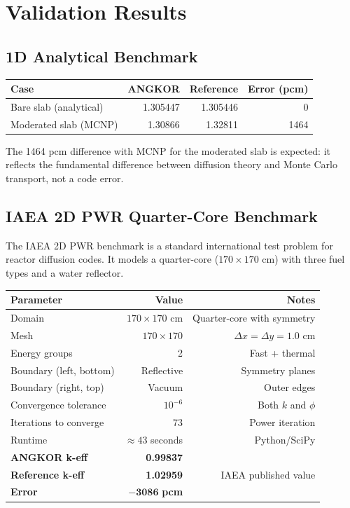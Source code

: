 \documentclass[12pt,a4paper]{article}
\begin{document}
\section{Validation Results}

\subsection{1D Analytical Benchmark}

\begin{center}
\begin{tabular}{lrrr}
\toprule
\textbf{Case} & \textbf{ANGKOR} & \textbf{Reference} & \textbf{Error (pcm)} \\
\midrule
Bare slab (analytical) & 1.305447 & 1.305446 & 0 \\
Moderated slab (MCNP) & 1.30866 & 1.32811 & 1464 \\
\bottomrule
\end{tabular}
\end{center}

The 1464 pcm difference with MCNP for the moderated slab is expected: it
reflects the fundamental difference between diffusion theory and Monte Carlo
transport, not a code error.

\subsection{IAEA 2D PWR Quarter-Core Benchmark}

The IAEA 2D PWR benchmark is a standard international test problem for
reactor diffusion codes. It models a quarter-core ($170 \times 170$ cm) with
three fuel types and a water reflector.

\begin{center}
\begin{tabular}{lrr}
\toprule
\textbf{Parameter} & \textbf{Value} & \textbf{Notes} \\
\midrule
Domain & $170 \times 170$ cm & Quarter-core with symmetry \\
Mesh & $170 \times 170$ & $\Delta x = \Delta y = 1.0$ cm \\
Energy groups & 2 & Fast + thermal \\
Boundary (left, bottom) & Reflective & Symmetry planes \\
Boundary (right, top) & Vacuum & Outer edges \\
Convergence tolerance & $10^{-6}$ & Both $k$ and $\phi$ \\
Iterations to converge & 73 & Power iteration \\
Runtime & $\approx 43$ seconds & Python/SciPy \\
\midrule
\textbf{ANGKOR k-eff} & \textbf{0.99837} & \\
\textbf{Reference k-eff} & \textbf{1.02959} & IAEA published value \\
\textbf{Error} & $\mathbf{-3086}$ \textbf{pcm} & \\
\bottomrule
\end{tabular}
\end{center}
\end{document}
